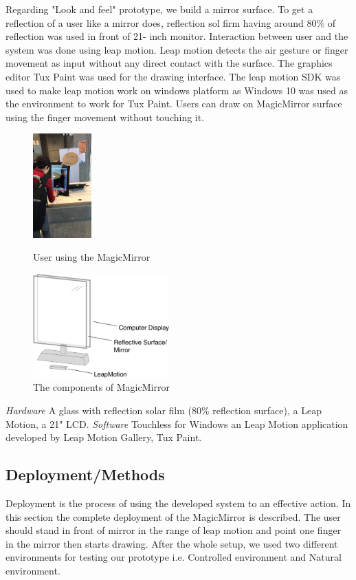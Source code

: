 \documentclass{sigchi-ext}
\begin{document}
Regarding "Look and feel" prototype, we build a mirror surface. To get a reflection of a user like a mirror does, reflection sol firm having around 80\% of reflection was used in front of 21- inch monitor. Interaction between user and the system was done using leap motion. Leap motion detects the air gesture or finger movement as input without any direct contact with the surface. The graphics editor Tux Paint was used for the drawing interface. The leap motion SDK was used to make leap motion work on windows platform as Windows 10 was used as the environment to work for Tux Paint. Users can draw on MagicMirror surface using the finger movement without touching it.
\begin{figure}[h]
	\center
  	\includegraphics[height=4cm, scale=0.2]{images/prototype}
	\caption{User using the MagicMirror}
	\center
  	\includegraphics[height=4cm, scale=0.5]{images/cartoon}
  	\caption{The components of MagicMirror}
  
\end{figure}

\textit{Hardware}
A glass with reflection solar film (80\% reflection surface), a Leap Motion, a 21" LCD.
\textit{Software}
Touchless for Windows an Leap Motion application developed by Leap Motion Gallery, Tux Paint.


\subsection{Deployment/Methods}
Deployment is the process of using the developed system to an effective action. In this section the complete deployment of the MagicMirror is described.
The user should stand in front of mirror in the range of leap motion and point one finger in the mirror then starts drawing.
After the whole setup, we used two different environments for testing our prototype i.e. Controlled environment and Natural environment.
\end{document}
